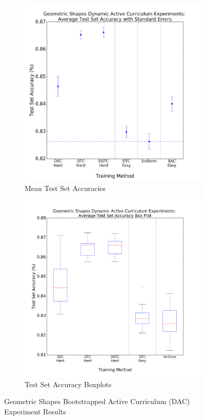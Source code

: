 \begin{figure}[h!]
\hspace*{-3cm}    
\centering
\begin{subfigure}{0.7\textwidth}
  \centering
  \includegraphics[width=1\linewidth]{GeoShapes_Dynamic_Results_STE.png}
  \caption{ Mean Test Set Accuracies}
  \label{fig:DAC_ste_Geo}
\end{subfigure}%
\begin{subfigure}{0.7\textwidth}
\hspace*{-1cm}   
  \centering
  \includegraphics[width=1\linewidth]{GeoShapes_Dynamic_Results_Boxplt.png}
  \caption{Test Set Accuracy Boxplots}
  \label{fig:DAC_BoxPlt_Geo}
\end{subfigure}
\caption{Geometric Shapes Bootstrapped Active Curriculum (DAC) Experiment Results}
\label{fig:GeoShapesDACResults}
\end{figure}

